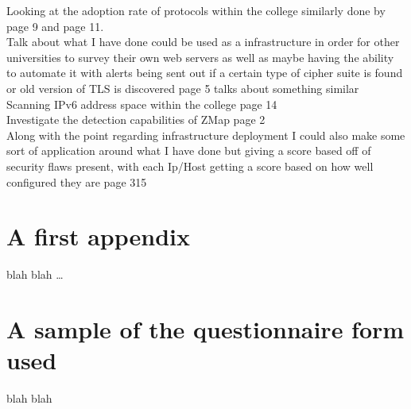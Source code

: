 \documentclass[a4wide,leqno,12pt]{report}
\begin{document}
Looking at the adoption rate of protocols within the college similarly done by \cite{durumeric2013zmap} page 9 and \cite{durumeric2013analysis} page 11.\\

Talk about what I have done could be used as a infrastructure in order for other universities to survey their own web servers as well as maybe having the ability to automate it with alerts being sent out if a certain type of cipher suite is found or old version of TLS is discovered\cite{durumeric2015search} page 5 talks about something similar\\

Scanning IPv6 address space within the college \cite{durumeric2013zmap} page 14\\

Investigate the detection capabilities of ZMap \cite{lee2003detection} page 2\\


Along with the point regarding infrastructure deployment I could also make some sort of application around what I have done but giving a score based off of security flaws present, with each Ip/Host getting a score based on how well configured they are \cite{mendes2008assessing} page 315





\appendix
\chapter{A first appendix}

blah blah \ldots


\chapter{A sample of the questionnaire form used}

blah blah
\end{document}
